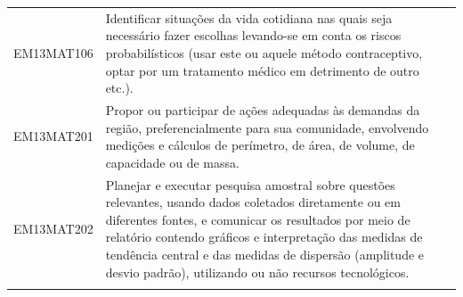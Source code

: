 \documentclass[12pt]{extarticle}
\begin{document}
\begin{longtable}{ll}
EM13MAT106 & Identificar situações da vida cotidiana nas quais seja necessário fazer escolhas levando-se em conta os riscos probabilísticos (usar este ou aquele método contraceptivo, optar por um tratamento médico em detrimento de outro etc.).                                                                                                                                                                                                                                                                                                                                                                                                                                                                                                                                                                                \\
\rowcolor[HTML]{FFF} 
EM13MAT201 & Propor ou participar de ações adequadas às demandas da região, preferencialmente para sua comunidade, envolvendo medições e cálculos de perímetro, de área, de volume, de capacidade ou de massa.                                                                                                                                                                                                                                                                                                                                                                                                                                                                                                                                                                                                                     \\
\rowcolor[HTML]{E0F7FA} 
EM13MAT202 & Planejar e executar pesquisa amostral sobre questões relevantes, usando dados coletados diretamente ou em diferentes fontes, e comunicar os resultados por meio de relatório contendo gráficos e interpretação das medidas de tendência central e das medidas de dispersão (amplitude e desvio padrão), utilizando ou não recursos tecnológicos.                                                                                                                                                                                                                                                                                                                                                                                                                                                                      \\
\rowcolor[HTML]{FFF} 

\end{longtable}
\end{document}
